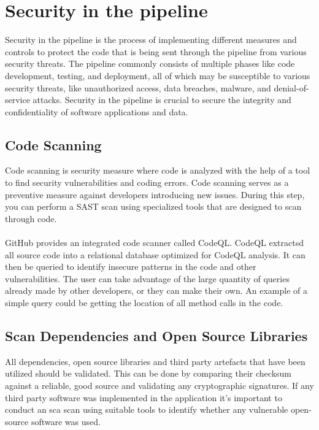 \section{Security in the pipeline}
Security in the pipeline is the process of implementing different measures and controls to protect the code that is being sent through the pipeline from various security threats. The pipeline commonly consists of multiple phases like code development, testing, and deployment, all of which may be susceptible to various security threats, like unauthorized access, data breaches, malware, and denial-of-service attacks. Security in the pipeline is crucial to secure the integrity and confidentiality of software applications and data.

\subsection{Code Scanning}
Code scanning is security measure where code is analyzed with the help of a tool to find security vulnerabilities and coding errors. Code scanning serves as a preventive measure against developers introducing new issues. During this step, you can perform a SAST scan using specialized tools that are designed to scan through code. 
\\
\\
GitHub provides an integrated code scanner called CodeQL. CodeQL extractsd all source code into a relational database optimized for CodeQL analysis.  It can then be queried to identify insecure patterns in the code and other vulnerabilities. The user can take advantage of the large quantity of queries already made by other developers, or they can make their own. An example of a simple query could be getting the location of all method calls in the code. 
 \cite{codeql}
\subsection{Scan Dependencies and Open Source Libraries}
All dependencies, open source libraries and third party artefacts that have been utilized should be validated. This can be done by comparing their checksum against a reliable, good source and validating any cryptographic signatures. If any third party software was implemented in the application it's important to conduct an \acrshort{sca} scan using suitable tools to identify whether any vulnerable open-source software was used. \cite{bestpracticeSupplyChain}

